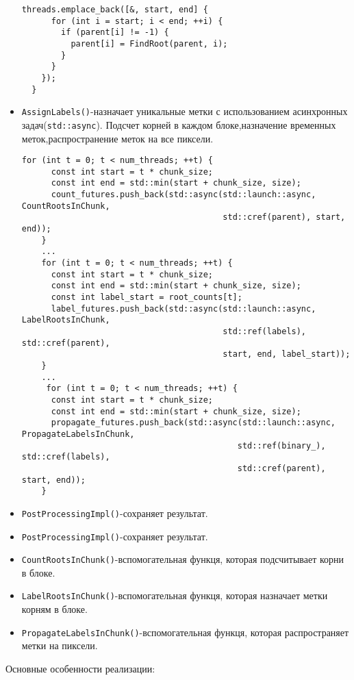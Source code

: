 \documentclass[12pt]{extarticle}
\begin{document}
\begin{itemize}
\begin{lstlisting}[caption={Обновление родительских ссылок в методе FinalizeRoots},label={all}]
    threads.emplace_back([&, start, end] {
      for (int i = start; i < end; ++i) {
        if (parent[i] != -1) {
          parent[i] = FindRoot(parent, i);
        }
      }
    });
  }
  \end{lstlisting}
  \item \texttt{AssignLabels()}-назначает уникальные метки с использованием асинхронных задач(\texttt{std::async}). Подсчет корней в каждом блоке,назначение временных меток,распространение меток на все пиксели.
  \begin{lstlisting}[caption={Назначение уникальных меток в методе AssignLabels},label={all}]
   for (int t = 0; t < num_threads; ++t) {
      const int start = t * chunk_size;
      const int end = std::min(start + chunk_size, size);
      count_futures.push_back(std::async(std::launch::async, CountRootsInChunk, 
                                         std::cref(parent), start, end));
    }
    ...
    for (int t = 0; t < num_threads; ++t) {
      const int start = t * chunk_size;
      const int end = std::min(start + chunk_size, size);
      const int label_start = root_counts[t];
      label_futures.push_back(std::async(std::launch::async, LabelRootsInChunk, 
                                         std::ref(labels), std::cref(parent), 
                                         start, end, label_start));
    }
    ...
     for (int t = 0; t < num_threads; ++t) {
      const int start = t * chunk_size;
      const int end = std::min(start + chunk_size, size);
      propagate_futures.push_back(std::async(std::launch::async, PropagateLabelsInChunk, 
                                            std::ref(binary_), std::cref(labels), 
                                            std::cref(parent), start, end));
    }
     \end{lstlisting}
    \item \texttt{PostProcessingImpl()}-сохраняет результат.
   \item \texttt{PostProcessingImpl()}-сохраняет результат.
    \item \texttt{CountRootsInChunk()}-вспомогательная функця, которая подсчитывает корни в блоке.
    \item \texttt{LabelRootsInChunk()}-вспомогательная функця, которая назначает метки корням в блоке.
    \item \texttt{PropagateLabelsInChunk()}-вспомогательная функця, которая распространяет метки на пиксели.
    
\end{itemize}
Основные особенности реализации:
\end{document}
